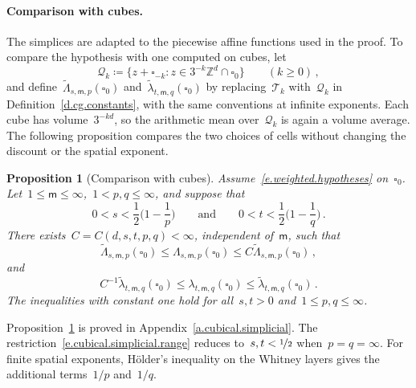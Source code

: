 \documentclass[11pt,letterpaper]{article}
\numberwithin{equation}{section}
\newtheorem{proposition}[theorem]{Proposition}
\theoremstyle{definition}
\newcommand{\Zd}{\mathbb{Z}^d}
\newcommand{\nf}{\nicefrac}
\newcommand{\cu}{\square}
\begin{document}
\paragraph{Comparison with cubes.} The simplices are adapted to the piecewise affine functions used in the proof. To compare the hypothesis with one computed on cubes, let
\begin{equation}
	\mathscr Q_k\coloneqq\{z+\cu_{-k}:z\in3^{-k}\Zd\cap\cu_0\}\qquad(k\geq0)\,,
	\label{e.cubical.family}
\end{equation}
and define~$\widetilde\Lambda_{s,\mathsf m,p}(\cu_0)$ and~$\widetilde\lambda_{t,\mathsf m,q}(\cu_0)$ by replacing~$\mathscr T_k$ with~$\mathscr Q_k$ in Definition~\ref{d.cg.constants}, with the same conventions at infinite exponents. Each cube has volume~$3^{-kd}$, so the arithmetic mean over~$\mathscr Q_k$ is again a volume average. The following proposition compares the two choices of cells without changing the discount or the spatial exponent.

\begin{proposition}[Comparison with cubes]
\label{p.cubical.simplicial.equivalence}
Assume~\eqref{e.weighted.hypotheses} on~$\cu_0$. Let~$1\leq\mathsf m\leq\infty$,~$1<p,q\leq\infty$, and suppose that
\begin{equation}
	0<s<\frac12\biggl(1-\frac1p\biggr) \qquad\mbox{and}\qquad 0<t<\frac12\biggl(1-\frac1q\biggr)\,.
	\label{e.cubical.simplicial.range}
\end{equation}
There exists~$C=C(d,s,t,p,q)<\infty$, independent of~$\mathsf m$, such that
\begin{equation}
	\widetilde\Lambda_{s,\mathsf m,p}(\cu_0) \leq\Lambda_{s,\mathsf m,p}(\cu_0) \leq C\widetilde\Lambda_{s,\mathsf m,p}(\cu_0)\,,
	\label{e.Lambda.cube.simplex.equivalence}
\end{equation}
and
\begin{equation}
	C^{-1}\widetilde\lambda_{t,\mathsf m,q}(\cu_0) \leq\lambda_{t,\mathsf m,q}(\cu_0) \leq\widetilde\lambda_{t,\mathsf m,q}(\cu_0)\,.
	\label{e.lambda.cube.simplex.equivalence}
\end{equation}
The inequalities with constant one hold for all~$s,t>0$ and~$1\leq p,q\leq\infty$.
\end{proposition}

Proposition~\ref{p.cubical.simplicial.equivalence} is proved in Appendix~\ref{a.cubical.simplicial}. The restriction~\eqref{e.cubical.simplicial.range} reduces to~$s,t<\nf12$ when~$p=q=\infty$. For finite spatial exponents, H\"older's inequality on the Whitney layers gives the additional terms~$1/p$ and~$1/q$.
\end{document}
